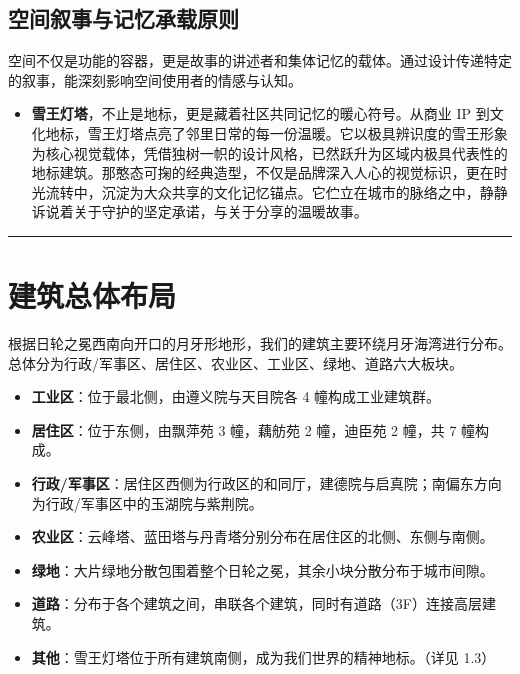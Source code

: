\subsection{空间叙事与记忆承载原则}\label{ux7a7aux95f4ux53d9ux4e8bux4e0eux8bb0ux5fc6ux627fux8f7dux539fux5219}

空间不仅是功能的容器，更是故事的讲述者和集体记忆的载体。通过设计传递特定的叙事，能深刻影响空间使用者的情感与认知。

\begin{itemize}
\tightlist
\item
  \textbf{雪王灯塔}，不止是地标，更是藏着社区共同记忆的暖心符号。从商业 IP 到文化地标，雪王灯塔点亮了邻里日常的每一份温暖。它以极具辨识度的雪王形象为核心视觉载体，凭借独树一帜的设计风格，已然跃升为区域内极具代表性的地标建筑。那憨态可掬的经典造型，不仅是品牌深入人心的视觉标识，更在时光流转中，沉淀为大众共享的文化记忆锚点。它伫立在城市的脉络之中，静静诉说着关于守护的坚定承诺，与关于分享的温暖故事。
\end{itemize}

\begin{center}\rule{0.5\linewidth}{0.5pt}\end{center}

\section{建筑总体布局}\label{ux5efaux7b51ux603bux4f53ux5e03ux5c40}

根据日轮之冕西南向开口的月牙形地形，我们的建筑主要环绕月牙海湾进行分布。总体分为行政/军事区、居住区、农业区、工业区、绿地、道路六大板块。

\begin{itemize}
\item
  \textbf{工业区}：位于最北侧，由遵义院与天目院各 4 幢构成工业建筑群。
\item
  \textbf{居住区}：位于东侧，由飘萍苑 3 幢，藕舫苑 2 幢，迪臣苑 2 幢，共 7 幢构成。
\item
  \textbf{行政/军事区}：居住区西侧为行政区的和同厅，建德院与启真院；南偏东方向为行政/军事区中的玉湖院与紫荆院。
\item
  \textbf{农业区}：云峰塔、蓝田塔与丹青塔分别分布在居住区的北侧、东侧与南侧。
\item
  \textbf{绿地}：大片绿地分散包围着整个日轮之冕，其余小块分散分布于城市间隙。
\item
  \textbf{道路}：分布于各个建筑之间，串联各个建筑，同时有道路（3F）连接高层建筑。
\item
  \textbf{其他}：雪王灯塔位于所有建筑南侧，成为我们世界的精神地标。（详见 1.3）
\end{itemize}

